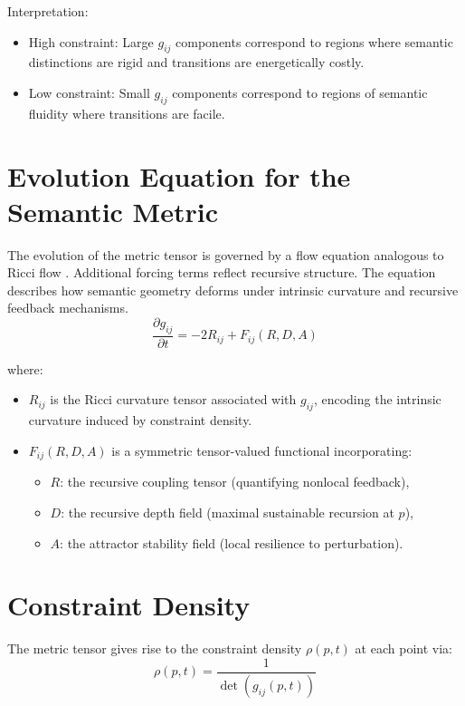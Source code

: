 Interpretation:
\begin{itemize}
    \item High constraint: Large \(g_{ij}\) components correspond to regions where semantic distinctions are rigid and transitions are energetically costly.
    \item Low constraint: Small \(g_{ij}\) components correspond to regions of semantic fluidity where transitions are facile.
\end{itemize}

\section{Evolution Equation for the Semantic Metric}

The evolution of the metric tensor is governed by a flow equation analogous to Ricci flow \autocite{Hamilton1982, Perelman2002}. Additional forcing terms reflect recursive structure. The equation describes how semantic geometry deforms under intrinsic curvature and recursive feedback mechanisms.
\begin{equation}
\frac{\partial g_{ij}}{\partial t} = -2 R_{ij} + F_{ij}(R, D, A)
\end{equation}

where:
\begin{itemize}
    \item \(R_{ij}\) is the Ricci curvature tensor associated with \(g_{ij}\), encoding the intrinsic curvature induced by constraint density.
    \item \(F_{ij}(R, D, A)\) is a symmetric tensor-valued functional incorporating:
    \begin{itemize}
        \item \(R\): the recursive coupling tensor (quantifying nonlocal feedback),
        \item \(D\): the recursive depth field (maximal sustainable recursion at \(p\)),
        \item \(A\): the attractor stability field (local resilience to perturbation).
    \end{itemize}
\end{itemize}

\section{Constraint Density}

The metric tensor gives rise to the constraint density \(\rho(p, t)\) at each point via:
\begin{equation}
\rho(p, t) = \frac{1}{\det(g_{ij}(p, t))}
\end{equation}

